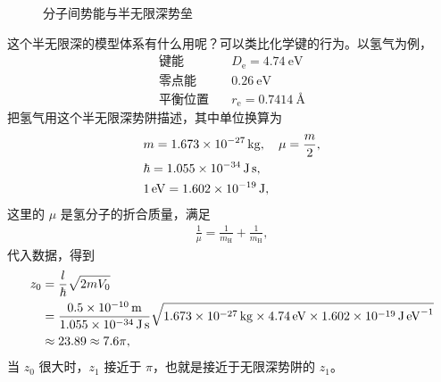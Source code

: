 \begin{figure}[tp]\centering
    \caption{分子间势能与半无限深势垒}
\end{figure}
这个半无限深的模型体系有什么用呢？可以类比化学键的行为。以氢气为例，
\begin{align}
    \text{键能} \quad &D_{\mathrm e} = \SI{4.74}{\electronvolt}\\
    \text{零点能} \quad &\SI{0.26}{\electronvolt}\\
    \text{平衡位置} \quad &r_{\mathrm e} = \SI{0.7414}{\angstrom}
\end{align}把氢气用这个半无限深势阱描述，其中单位换算为
\begin{align}
    & m = \SI{1.673E-27}{\kilo\gram}, \quad \mu = \frac{m}2, \\
    & \hbar = \SI{1.055E-34}{\joule\second},\\
    & \SI{1}{\electronvolt} = \SI{1.602E-19}{\joule},
\end{align}
这里的 $\mu$ 是氢分子的折合质量，满足
\begin{align}
    \frac1\mu = \frac1{m_{\mathrm H}} + \frac1{m_{\mathrm H}}, 
\end{align}
代入数据，得到
\begin{align}
    z_0 &= \frac{l}{\hbar} \sqrt{2 m V_0} \notag\\
    &= \frac{\SI{0.5E-10}{\metre}}{\SI{1.055E-34}{\joule\second}} \sqrt{
        \SI{1.673E-27}{\kilo\gram} \times 
        \SI{4.74}{\electronvolt} \times
        \SI{1.602E-19}{\joule\per\electronvolt}
    } \notag\\
    &\approx 23.89 \approx 7.6 \pi,
\end{align}
当 $z_0$ 很大时，$z_1$ 接近于 $\pi$，也就是接近于无限深势阱的 $z_1$。

